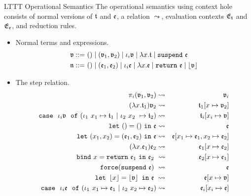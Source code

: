 \begin{frame}[allowframebreaks]{LTTT Operational Semantics}
    The operational semantics using context hole consists of normal versions of $\mathfrak{t}$ and $\mathfrak{e}$, a relation $\leadsto$, evaluation contexts $\mathfrak{E}_{\mathfrak{t}}$ and $\mathfrak{E}_{\mathfrak{e}}$, and reduction rules.
    
    \begin{itemize}
        \item Normal terms and expressions.
        \begin{align*}
            \mathfrak{v} ::=&~ () \mid (\mathfrak{v}_1, \mathfrak{v}_2) \mid \iota_i \mathfrak{v} \mid \lambda x. \mathfrak{t} \mid \mathtt{suspend}~\mathfrak{e} \\
            \mathfrak{n} ::=&~ () \mid (\mathfrak{e}_1, \mathfrak{e}_2) \mid \iota_i \mathfrak{e} \mid \lambda x. \mathfrak{e} \mid \mathtt{return}~\mathfrak{e} \mid \left\lfloor \mathfrak{v} \right\rfloor
        \end{align*}
    
        \item The step relation.
        \begin{eqnarray*}
        \pi_i(\v_1, \v_2) &\leadsto& \v_i\\
        (\lambda x.\t_1)\v_2 &\leadsto& \t_1 [x \mapsto \v_2]\\
        \mathtt{case}\ \ \iota_i\v \ \ \mathtt{of}\ (\iota_1\ x_1 \mapsto \t_1\  \lvert\  \iota_2 \ x_2 \ \mapsto \t_2) &\leadsto& \t_i [x_i \mapsto \v]\\
        \mathtt{let}\ ()=()\ \mathtt{in} \ \e &\leadsto& \e\\
        \mathtt{let}\ (x_1,x_2)=(\e_1,\e_2)\ \mathtt{in}\ \e &\leadsto& \e[x_1 \mapsto \e_1, x_2 \mapsto \e_2]\\
        (\lambda x.\e_1)\e_2 &\leadsto& \e_1[x \mapsto \e_2]\\
        \mathtt{bind}\ x = \mathtt{return} \ \e_1\ \mathtt{in} \ \e_2\ &\leadsto&\ \e_2 [x \mapsto \e_1]\\
        \mathtt{force}( \mathtt{suspend}\ \e)\ &\leadsto& \e\\
        \mathtt{let}\  \floor{x}=\floor{\v}\  \mathtt{in}\ \e\ &\leadsto& \e[x\mapsto \v]\\
        \mathtt{case}\ \ \iota_i\e \ \ \mathtt{of}\ (\iota_1\ x_1 \mapsto \e_1\  \lvert\  \iota_2 \ x_2 \mapsto \e_2) &\leadsto& \e_i [x_i \mapsto \e]
        \end{eqnarray*}
        

\end{itemize}
\end{frame}
